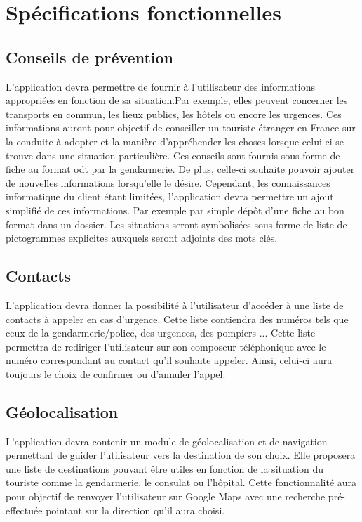 \section{Spécifications fonctionnelles}
	
\subsection{Conseils de prévention}
	L'application devra permettre de fournir à l'utilisateur des informations appropriées en fonction de sa situation.Par exemple, elles peuvent concerner les transports en commun, les lieux publics, les hôtels ou encore les urgences. Ces informations auront pour objectif de conseiller un touriste étranger en France sur la conduite à adopter et la manière d'appréhender les choses lorsque celui-ci se trouve dans une situation particulière. Ces conseils sont fournis sous forme de fiche au format odt par la gendarmerie. De plus, celle-ci souhaite pouvoir ajouter de nouvelles informations lorsqu'elle le désire. Cependant, les connaissances informatique du client étant limitées, l'application devra permettre un ajout simplifié de ces informations. Par exemple par simple dépôt d'une fiche au bon format dans un dossier. Les situations seront symbolisées sous forme de liste de pictogrammes explicites auxquels seront adjoints des mots clés.
	
\subsection{Contacts}

	L'application devra donner la possibilité à l'utilisateur d'accéder à une liste de contacts à appeler en cas d'urgence. Cette liste contiendra des numéros tels que ceux de la gendarmerie/police, des urgences, des pompiers ... Cette liste permettra de rediriger l'utilisateur sur son composeur téléphonique avec le numéro correspondant au contact qu'il souhaite appeler. Ainsi, celui-ci aura toujours le choix de confirmer ou d'annuler l'appel.
	
\subsection{Géolocalisation}

	L'application devra contenir un module de géolocalisation et de navigation permettant de guider l'utilisateur vers la destination de son choix. Elle proposera une liste de destinations pouvant être utiles en fonction de la situation du touriste comme la gendarmerie, le consulat ou l'hôpital. Cette fonctionnalité aura pour objectif de renvoyer l'utilisateur sur Google Maps avec une recherche pré-effectuée pointant sur la direction qu'il aura choisi.

